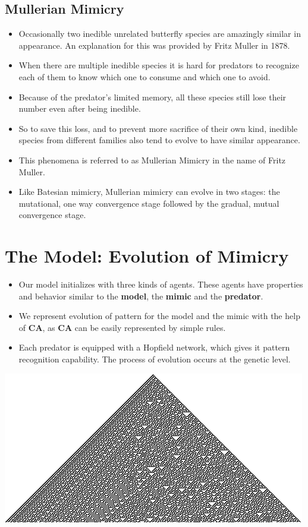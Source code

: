 \documentclass[a0,portrait]{a0poster}
\begin{document}
\begin{multicols}{2}
\subsection*{Mullerian Mimicry}
\begin{itemize}
	\item Occasionally two inedible unrelated butterfly species are amazingly similar in appearance. An explanation for this was provided by Fritz Muller in 1878. 
	\item When there are multiple inedible species it is hard for predators to recognize each of them to know which one to consume and which one to avoid.
	\item Because of the predator's limited memory, all these species still lose their number even after being inedible. 
	\item So to save this loss, and to prevent more sacrifice of their own kind, inedible species from different families also tend to evolve to have similar appearance. 
	\item This phenomena is referred to as Mullerian Mimicry in the name of Fritz Muller. 
	\item Like Batesian mimicry, Mullerian mimicry can evolve in two stages: the mutational, one way convergence stage followed by the gradual, mutual convergence stage.
\end{itemize}

\color{SaddleBrown} 
\section*{The Model: Evolution of Mimicry}

\begin{itemize}
	\item Our model initializes with three kinds of agents. These agents have properties and behavior similar to the \textbf{model}, the \textbf{mimic} and the \textbf{predator}.
	\item We represent evolution of pattern for the model and the mimic with the help of \textbf{CA}, as \textbf{CA} can be easily represented by simple rules.
	\item Each predator is equipped with a Hopfield network, which gives it pattern recognition capability. The process of evolution occurs at the genetic level.
\end{itemize}

\begin{center}\vspace{1cm}
\includegraphics[width=0.50\linewidth]{CA_rule30s.png}
\label{fig:cellular-automata-rule-30}
\end{center}\vspace{1cm}


\end{multicols}
\end{document}
